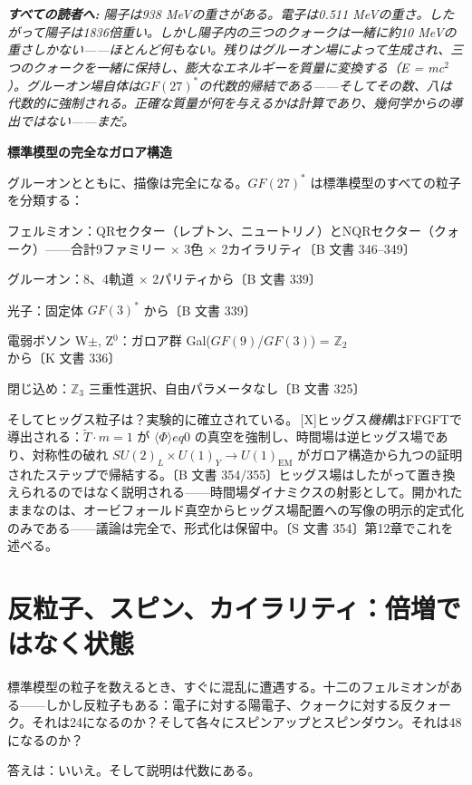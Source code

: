 \documentclass[11pt,openany]{book}
\newcommand{\status}[1]{\penalty10000\,{\tiny\textcolor{gray!70}{[#1]}}}
\newenvironment{laierspur}{%
  \par\vspace{4pt}%
  \noindent\small\itshape\color{blue!60!black}%
  \textbf{すべての読者へ:}\enspace\ignorespaces}{%
  \par\vspace{4pt}\normalsize\normalfont\normalcolor}
\begin{document}
\begin{laierspur}
陽子は938 MeVの重さがある。電子は0.511 MeVの重さ。したがって陽子は1836倍重い。しかし陽子内の三つのクォークは一緒に約10 MeVの重さしかない——ほとんど何もない。残りはグルーオン場によって生成され、三つのクォークを一緒に保持し、膨大なエネルギーを質量に変換する（E = mc$^2$）。グルーオン場自体は$GF(27)^*$の代数的帰結である——そしてその数、八は代数的に強制される。正確な質量が何を与えるかは計算であり、幾何学からの導出ではない——まだ。
\end{laierspur}

\textbf{標準模型の完全なガロア構造}

グルーオンとともに、描像は完全になる。$GF(27)^*$ は標準模型のすべての粒子を分類する：

フェルミオン：QRセクター（レプトン、ニュートリノ）とNQRセクター（クォーク）——合計9ファミリー $\times$ 3色 $\times$ 2カイラリティ〔B 文書 346–349〕

グルーオン：8、4軌道 $\times$ 2パリティから〔B 文書 339〕

光子：固定体 $GF(3)^*$ から〔B 文書 339〕

電弱ボソン W$\pm$, Z$^0$：ガロア群 Gal($GF(9)$/$GF(3)$) = $\mathbb{Z}_2$ から〔K 文書 336〕

閉じ込め：$\mathbb{Z}_3$ 三重性選択、自由パラメータなし〔B 文書 325〕

そしてヒッグス粒子は？実験的に確立されている。\status{X}ヒッグス\textit{機構}はFFGFTで導出される：$\tilde{T}\cdot m = 1$ が $\langle\Phi\rangle 
eq 0$ の真空を強制し、時間場は逆ヒッグス場であり、対称性の破れ $SU(2)_L\times U(1)_Y \to U(1)_\text{EM}$ がガロア構造から九つの証明されたステップで帰結する。〔B 文書 354/355〕ヒッグス場はしたがって置き換えられるのではなく説明される——時間場ダイナミクスの射影として。開かれたままなのは、オービフォールド真空からヒッグス場配置への写像の明示的定式化のみである——議論は完全で、形式化は保留中。〔S 文書 354〕第12章でこれを述べる。

\medskip

\chapter{反粒子、スピン、カイラリティ：倍増ではなく状態}

標準模型の粒子を数えるとき、すぐに混乱に遭遇する。十二のフェルミオンがある——しかし反粒子もある：電子に対する陽電子、クォークに対する反クォーク。それは24になるのか？そして各々にスピンアップとスピンダウン。それは48になるのか？

答えは：いいえ。そして説明は代数にある。
\end{document}
